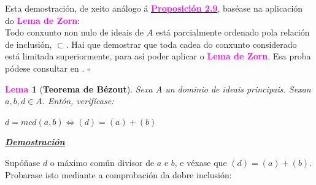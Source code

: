 \documentclass[twoside]{report}
\newcommand{\magbf}[1]{\textcolor{magenta}{\textbf{#1}}} %
\theoremstyle{mystyle}
\newtheorem{lem}{\magbf{Lema}}[chapter]
\newenvironment{lemma}
{\begin{mdframed}[linecolor = magenta,backgroundcolor = classicrose, linewidth = 2mm]\begin{lem}}
{\end{lem}\end{mdframed}}
\begin{document}
\vspace{2mm}

\noindent Esta demostración, de xeito análogo á \hyperref[prop2.9]{\magbf{Proposición 2.9}}, baséase na aplicación do \magbf{Lema de Zorn}: \\

\noindent Todo conxunto non nulo de ideais de $A$ está parcialmente ordenado pola relación de inclusión, $\subset$. Hai que demostrar que toda cadea do conxunto considerado está limitada superiormente, para así poder aplicar o \magbf{Lema de Zorn}. Esa proba pódese consultar en \cite{fraleigh}. $\square$

\vspace{3mm}

\begin{lemma}[\textbf{Teorema de Bézout}] \label{lem2.2}
Sexa $A$ un dominio de ideais principais. Sexan $a,b,d \in A$. Entón, verifícase:
\begin{center}
    $d = mcd(a,b) \Longleftrightarrow (d) = (a) + (b)$  
\end{center}
\end{lemma}

\vspace{2mm}

\noindent \textbf{\textit{\underline{Demostración}}}

\vspace{2mm}

\noindent {} Supóñase $d$ o máximo común divisor de $a$ e $b$, e véxase que $(d) = (a) + (b)$. Probarase isto mediante a comprobación da dobre inclusión:
\end{document}
